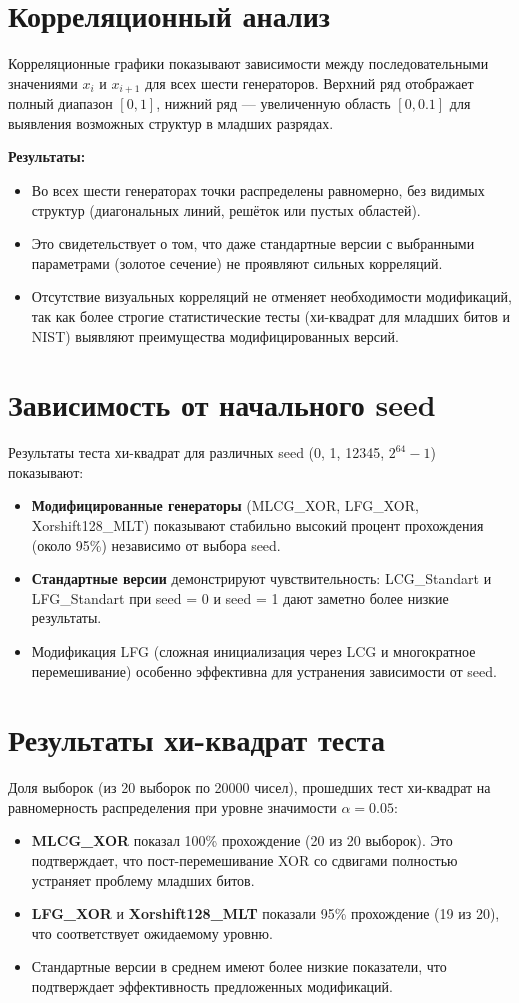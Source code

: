\documentclass[twoside]{book}
\newcommand{\+}{\discretionary{\mbox{\scriptsize$\hookleftarrow$}}{}{}}
\begin{document}
\section{Корреляционный анализ}
Корреляционные графики показывают зависимости между последовательными значениями \(x_i\) и \(x_{i+1}\) для всех шести генераторов. Верхний ряд отображает полный диапазон \([0,1]\), нижний ряд — увеличенную область \([0,0.1]\) для выявления возможных структур в младших разрядах.

\textbf{Результаты:}
\begin{itemize}
    \item Во всех шести генераторах точки распределены равномерно, без видимых структур (диагональных линий, решёток или пустых областей).
    \item Это свидетельствует о том, что даже стандартные версии с выбранными параметрами (золотое сечение) не проявляют сильных корреляций.
    \item Отсутствие визуальных корреляций не отменяет необходимости модификаций, так как более строгие статистические тесты (хи-квадрат для младших битов и NIST) выявляют преимущества модифицированных версий.
\end{itemize}

\section{Зависимость от начального seed}
Результаты теста хи-квадрат для различных seed (0, 1, 12345, \(2^{64}-1\)) показывают:
\begin{itemize}
    \item \textbf{Модифицированные генераторы} (MLCG\_XOR, LFG\_XOR, Xorshift128\_MLT) показывают стабильно высокий процент прохождения (около 95\%) независимо от выбора seed.
    \item \textbf{Стандартные версии} демонстрируют чувствительность: LCG\_Standart и LFG\_Standart при seed = 0 и seed = 1 дают заметно более низкие результаты.
    \item Модификация LFG (сложная инициализация через LCG и многократное перемешивание) особенно эффективна для устранения зависимости от seed.
\end{itemize}

\section{Результаты хи-квадрат теста}
Доля выборок (из 20 выборок по 20000 чисел), прошедших тест хи-квадрат на равномерность распределения при уровне значимости \(\alpha = 0.05\):
\begin{itemize}
    \item \textbf{MLCG\_XOR} показал 100\% прохождение (20 из 20 выборок). Это подтверждает, что пост-перемешивание XOR со сдвигами полностью устраняет проблему младших битов.
    \item \textbf{LFG\_XOR} и \textbf{Xorshift128\_MLT} показали 95\% прохождение (19 из 20), что соответствует ожидаемому уровню.
    \item Стандартные версии в среднем имеют более низкие показатели, что подтверждает эффективность предложенных модификаций.
\end{itemize}
\end{document}
